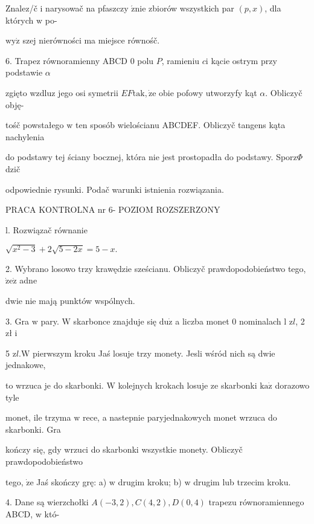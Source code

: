 \documentclass[a4paper,12pt]{article}
\begin{document}
Znalez/č $\mathrm{i}$ narysowač na pfaszczy $\acute{\mathrm{z}}\mathrm{n}\mathrm{i}\mathrm{e}$ zbiorów wszystkich par $(p,x)$, dla których $\mathrm{w}$ po-

$\mathrm{w}\mathrm{y}\dot{\mathrm{z}}$ szej nierówności ma miejsce równośč.

6. Trapez równoramienny ABCD $0$ polu $P$, ramieniu $c\mathrm{i}$ kącie ostrym przy podstawie $\alpha$

zgięto wzdluz jego osi symetrii $EF\mathrm{t}\mathrm{a}\mathrm{k}, \dot{\mathrm{z}}\mathrm{e}$ obie pofowy utworzyfy kąt $\alpha$. Obliczyč obję-

tośč powstałego $\mathrm{w}$ ten sposób wielościanu ABCDEF. Obliczyč tangens kąta nachylenia

do podstawy tej ściany bocznej, która nie jest prostopadła do podstawy. Sporz$\Phi$dzič

odpowiednie rysunki. Podač warunki istnienia rozwiązania.





PRACA KONTROLNA nr 6- POZIOM ROZSZERZONY

l. Rozwiązač równanie

$\sqrt{x^{2}-3}+2\sqrt{5-2x}=5-x.$

2. Wybrano losowo trzy krawędzie sześcianu. Obliczyč prawdopodobieństwo tego, $\dot{\mathrm{z}}\mathrm{e}\dot{\mathrm{z}}$ adne

dwie nie mają punktów wspólnych.

3. Gra $\mathrm{w}$ pary. $\mathrm{W}$ skarbonce znajduje się $\mathrm{d}\mathrm{u}\dot{\mathrm{z}}$ a liczba monet $0$ nominalach l $\mathrm{z}l$, 2 zł $\mathrm{i}$

5 $\mathrm{z}l. \mathrm{W}$ pierwszym kroku Jaś losuje trzy monety. Jesli wśród nich są dwie jednakowe,

to wrzuca je do skarbonki. $\mathrm{W}$ kolejnych krokach losuje ze skarbonki $\mathrm{k}\mathrm{a}\dot{\mathrm{z}}$ dorazowo tyle

monet, ile trzyma $\mathrm{w}$ rece, a nastepnie paryjednakowych monet wrzuca do skarbonki. Gra

kończy się, gdy wrzuci do skarbonki wszystkie monety. Obliczyč prawdopodobieństwo

tego, $\dot{\mathrm{z}}\mathrm{e}$ Jaś skończy grę: a) $\mathrm{w}$ drugim kroku; b) $\mathrm{w}$ drugim lub trzecim kroku.

4. Dane są wierzchołki $A(-3,2), C(4,2), D(0,4)$ trapezu równoramiennego ABCD, $\mathrm{w}$ któ-
\end{document}
